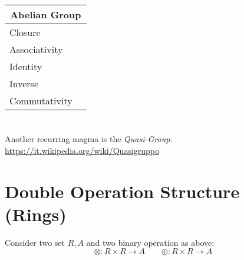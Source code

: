 \documentclass[a4paper,12pt]{scrartcl}
\newcommand{\OpA}{\otimes}
\newcommand{\OpB}{\oplus}
\begin{document}
\begin{landscape}
\begin{minipage}[c]{0,5\textwidth}
\vspace{0.6cm}
\begin{tabular}{|l|p{2cm}|} %
  \hline
  \multicolumn{2}{c}{\cellcolor{yellow!25}Abelian Group} \\
  \hline
   \cellcolor{blue!25} Closure&  \\
    \cellcolor{blue!25} Associativity&  \\
    \cellcolor{blue!25} Identity&  \\
    \cellcolor{blue!25} Inverse&  \\
    \cellcolor{blue!25} Commutativity&  \\
  \hline
\end{tabular}

\end{minipage}
		
\end{landscape}
 
\newpage



\section{}






\begin{observation}
	Another recurring magma is the \emph{Quasi-Group}.
	\url{https://it.wikipedia.org/wiki/Quasigruppo}
\end{observation}

\newpage
\section{Double Operation Structure (Rings)}
Consider two set $R, A$ and two binary operation as above:
\begin{displaymath}
		\OpA : R \times R \rightarrow A \qquad 	\OpB : R \times R \rightarrow A
\end{displaymath}
\end{document}
